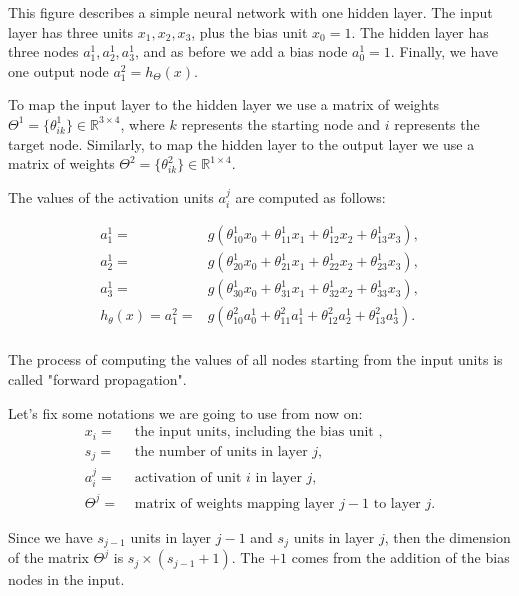 \documentclass[a4paper,11pt]{report}
\begin{document}
This figure describes a simple neural network with one hidden layer. The input layer has three units $x_1, x_2, x_3$, plus the bias unit $x_0=1$. The hidden layer has three nodes $a^1_1, a^1_2, a^1_3$, and as before we add a bias node $a^1_0=1$. Finally, we have one output node $a^2_1 = h_\Theta(x)$.

To map the input layer to the hidden layer we use a matrix of weights $\Theta^1 = \{\theta^1_{ik}\}\in\mathbb{R}^{3\times 4}$, where $k$ represents the starting node and $i$ represents the target node. Similarly, to map the hidden layer to the output layer we use a matrix of weights $\Theta^2 = \{\theta^2_{ik}\}\in\mathbb{R}^{1\times 4}$.

The values of the activation units $a^j_i$ are computed as follows:

\begin{equation}\label{eq:nn-act-nod}
\begin{split}
a_1^{1} = & g(\theta_{10}^{1}x_0 + \theta_{11}^{1}x_1 + \theta_{12}^{1}x_2 + \theta_{13}^{1}x_3), \\
a_2^{1} = & g(\theta_{20}^{1}x_0 + \theta_{21}^{1}x_1 + \theta_{22}^{1}x_2 + \theta_{23}^{1}x_3), \\
a_3^{1} = & g(\theta_{30}^{1}x_0 + \theta_{31}^{1}x_1 + \theta_{32}^{1}x_2 + \theta_{33}^{1}x_3), \\
h_\theta(x) =  a_1^{2} = & g(\theta_{10}^{2}a_0^{1} + \theta_{11}^{2}a_1^{1} + \theta_{12}^{2}a_2^{1} + \theta_{13}^{2}a_3^{1}). \\
\end{split}
\end{equation}

The process of computing the values of all nodes starting from the input units is called "forward propagation".

Let's fix some notations we are going to use from now on:
\begin{align*}
x_i = & \text{ the input units, including the bias unit }, \\
s_j = & \text{ the number of units in layer $j$}, \\
a_i^j = & \text{ activation of unit $i$ in layer $j$}, \\
\Theta^j = & \text{ matrix of weights mapping layer $j-1$ to layer $j$}.
\end{align*}

Since we have $s_{j-1}$ units in layer $j-1$ and $s_{j}$ units in layer $j$, then the dimension of the matrix $\Theta^j$  is $s_{j}\times (s_{j-1}+1)$. The $+1$ comes from the addition of the bias nodes in the input.
\end{document}
